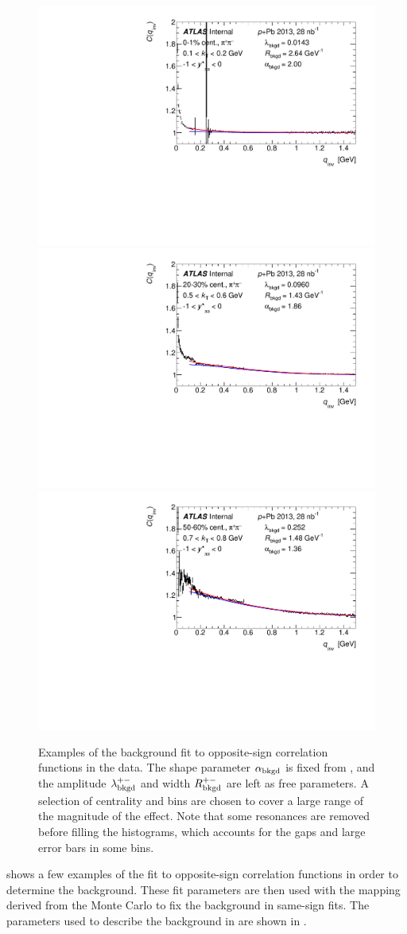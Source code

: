 \begin{figure}[t]
\centering
\includegraphics[width=.32\linewidth]{Cqinv_cent0_e0_kt0_ys1.pdf}
\includegraphics[width=.32\linewidth]{Cqinv_cent4_e0_kt4_ys1.pdf}
\includegraphics[width=.32\linewidth]{Cqinv_cent7_e0_kt6_ys1.pdf}
\caption{Examples of the background fit to opposite-sign correlation functions in the data. The shape parameter $\alpha_{\mathrm{bkgd}}$ is fixed from , and the amplitude $\lambda_{\mathrm{bkgd}}^{+-}$ and width $R_{\mathrm{bkgd}}^{+-}$ are left as free parameters. A selection of centrality and \kt bins are chosen to cover a large range of the magnitude of the effect. Note that some resonances are removed before filling the histograms, which accounts for the gaps and large error bars in some bins.}
\label{fig:background_qinv_opp_example}
\end{figure}

 shows a few examples of the fit to opposite-sign correlation functions in order to determine the background.
These fit parameters are then used with the mapping derived from the Monte Carlo to fix the background in same-sign fits.
The parameters used to describe the background in \qinv are shown in .

